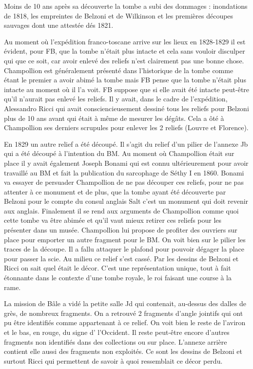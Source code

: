\documentclass{article}
\begin{document}
Moins de 10 ans après sa découverte la tombe a subi des dommages :
inondations de 1818, les empreintes de Belzoni et de Wilkinson et les
premières découpes sauvages dont une attestée dés 1821.

Au moment où l’expédition franco-toscane arrive sur les lieux en
1828-1829 il est évident, pour FB, que la tombe n’était plus intacte et
cela sans vouloir disculper qui que ce soit, car avoir enlevé des
reliefs n’est clairement pas une bonne chose. Champollion est
généralement présenté dans l’historique de la tombe comme étant le
premier a avoir abimé la tombe mais FB pense que la tombe n’était plus
intacte au moment où il l’a voit. FB suppose que si elle avait été
intacte peut-être qu’il n’aurait pas enlevé les reliefs.  Il y avait,
dans le cadre de l’expédition, Alessandro  Ricci qui avait
consciencieusement dessiné tous les reliefs pour Belzoni plus de 10 ans
avant qui était à même de mesurer les dégâts. Cela a ôté à Champollion
ses derniers scrupules pour enlever les 2 reliefs (Louvre et Florence).

En 1829 un autre relief a été découpé. Il s’agit du relief d’un pilier
de l’annexe Jb qui a été découpé à l’intention du BM. Au moment où
Champollion était sur place il y avait également Joseph Bonami qui est
connu ultérieurement pour avoir travaillé au BM et fait la publication
du sarcophage de Séthy I en 1860. Bonami va essayer de persuader
Champollion de ne pas découper ces reliefs, pour ne pas attenter à ce
monument et de plus, que la tombe ayant été découverte par Belzoni pour
le compte du consul anglais Salt c’est un monument qui doit revenir aux
anglais. Finalement il se rend aux arguments de Champollion comme quoi
cette tombe va être abimée et qu’il vaut mieux retirer ces reliefs pour
les présenter dans un musée. Champollion lui propose de profiter des
ouvriers sur place  pour emporter un autre fragment pour le BM.  On
voit bien sur le pilier les traces de la découpe. Il a fallu attaquer
le plafond pour pouvoir dégager la place pour passer la scie. Au milieu
ce relief s’est cassé. Par les dessins de Belzoni et Ricci on sait quel
était le décor. C’est une représentation unique, tout à fait étonnante
dans le contexte d’une tombe royale, le roi faisant une course à la
rame. 

La mission de Bâle a vidé la petite salle Jd qui contenait, au-dessus
des dalles de grès, de nombreux fragments. On a retrouvé 2 fragments
d’angle jointifs qui ont pu être identifiés comme appartenant à ce
relief. On voit bien le reste de l’aviron et le bas, en rouge,  du
signe d’ l’Occident. Il reste peut-être encore d’autres fragments non
identifiés dans des collections ou sur place. L’annexe arrière contient
elle aussi des fragments non exploités. Ce sont les dessins de Belzoni
et surtout Ricci qui permettent de savoir à quoi ressemblait ce décor
perdu.
\end{document}
